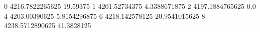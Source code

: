 0 4216.7822265625 19.59375
1 4201.52734375 4.3388671875
2 4197.1884765625 0.0
4 4203.00390625 5.8154296875
6 4218.142578125 20.9541015625
8 4238.5712890625 41.3828125
